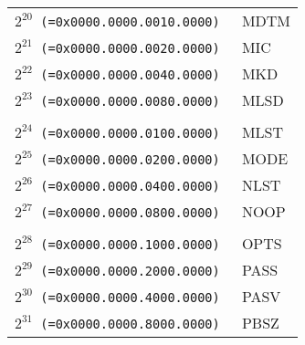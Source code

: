 \documentclass[documentation]{subfiles}
\begin{document}
\begin{minipage}{.48\textwidth}
\begin{longtable}{>{\tt}rl}
        $2^{20}$ (=0x0000.0000.0010.0000) & MDTM\\
        $2^{21}$ (=0x0000.0000.0020.0000) & MIC\\
        $2^{22}$ (=0x0000.0000.0040.0000) & MKD\\
        $2^{23}$ (=0x0000.0000.0080.0000) & MLSD\\
        \\
        $2^{24}$ (=0x0000.0000.0100.0000) & MLST\\
        $2^{25}$ (=0x0000.0000.0200.0000) & MODE\\
        $2^{26}$ (=0x0000.0000.0400.0000) & NLST\\
        $2^{27}$ (=0x0000.0000.0800.0000) & NOOP\\
        \\
        $2^{28}$ (=0x0000.0000.1000.0000) & OPTS\\
        $2^{29}$ (=0x0000.0000.2000.0000) & PASS\\
        $2^{30}$ (=0x0000.0000.4000.0000) & PASV\\
        $2^{31}$ (=0x0000.0000.8000.0000) & PBSZ\\
        \bottomrule
    \end{longtable}
\end{minipage}
\end{document}
